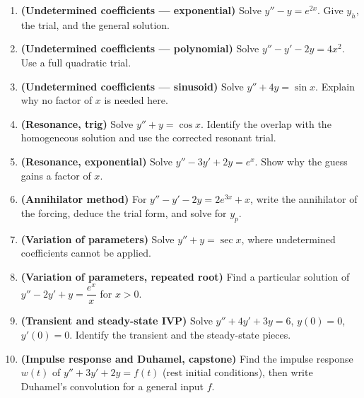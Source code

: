\begin{enumerate}[leftmargin=2em]
    \item \textbf{(Undetermined coefficients --- exponential)} Solve
          $y'' - y = e^{2x}$. Give $y_h$, the trial, and the general solution.

    \item \textbf{(Undetermined coefficients --- polynomial)} Solve
          $y'' - y' - 2y = 4x^2$. Use a full quadratic trial.

    \item \textbf{(Undetermined coefficients --- sinusoid)} Solve
          $y'' + 4y = \sin x$. Explain why no factor of $x$ is needed here.

    \item \textbf{(Resonance, trig)} Solve $y'' + y = \cos x$. Identify the overlap
          with the homogeneous solution and use the corrected resonant trial.

    \item \textbf{(Resonance, exponential)} Solve $y'' - 3y' + 2y = e^{x}$.
          Show why the guess gains a factor of $x$.

    \item \textbf{(Annihilator method)} For $y'' - y' - 2y = 2e^{3x} + x$, write the
          annihilator of the forcing, deduce the trial form, and solve for $y_p$.

    \item \textbf{(Variation of parameters)} Solve $y'' + y = \sec x$, where
          undetermined coefficients cannot be applied.

    \item \textbf{(Variation of parameters, repeated root)} Find a particular
          solution of $y'' - 2y' + y = \dfrac{e^{x}}{x}$ for $x>0$.

    \item \textbf{(Transient and steady-state IVP)} Solve
          $y'' + 4y' + 3y = 6$, $y(0)=0$, $y'(0)=0$. Identify the transient and the
          steady-state pieces.

    \item \textbf{(Impulse response and Duhamel, capstone)} Find the impulse
          response $w(t)$ of $y'' + 3y' + 2y = f(t)$ (rest initial conditions), then
          write Duhamel's convolution for a general input $f$.
\end{enumerate}

\clearpage
{}
{}
